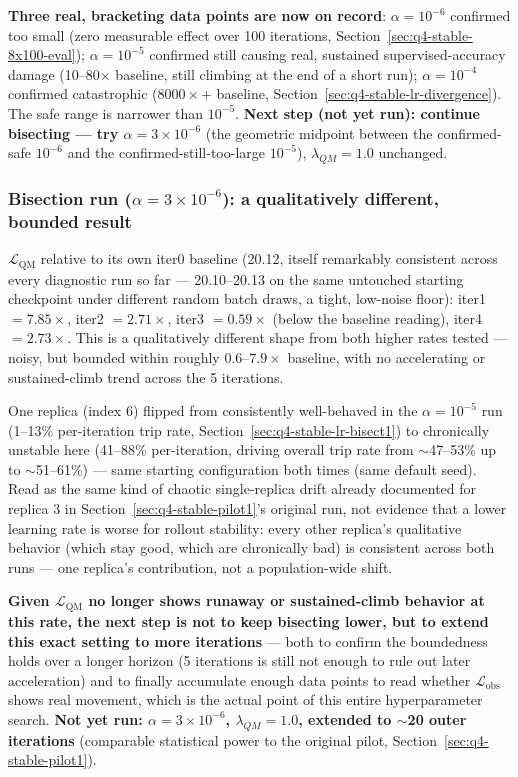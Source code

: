 \documentclass[11pt]{article}
\begin{document}
\textbf{Three real, bracketing data points are now on record}: $\alpha=
10^{-6}$ confirmed too small (zero measurable effect over 100 iterations,
Section~\ref{sec:q4-stable-8x100-eval}); $\alpha=10^{-5}$ confirmed still
causing real, sustained supervised-accuracy damage (10--80$\times$
baseline, still climbing at the end of a short run); $\alpha=10^{-4}$
confirmed catastrophic ($8000\times$+ baseline,
Section~\ref{sec:q4-stable-lr-divergence}). The safe range is narrower than
$10^{-5}$. \textbf{Next step (not yet run): continue bisecting --- try
$\alpha=3\times10^{-6}$} (the geometric midpoint between the confirmed-safe
$10^{-6}$ and the confirmed-still-too-large $10^{-5}$), $\lambda_{QM}=1.0$
unchanged.

\subsubsection{Bisection run ($\alpha=3\times10^{-6}$): a qualitatively different, bounded result}
\label{sec:q4-stable-lr-bisect2}

$\mathcal{L}_{\text{QM}}$ relative to its own iter0 baseline (20.12, itself
remarkably consistent across every diagnostic run so far --- 20.10--20.13
on the same untouched starting checkpoint under different random batch
draws, a tight, low-noise floor): iter1 $=7.85\times$, iter2 $=2.71\times$,
iter3 $=0.59\times$ (below the baseline reading), iter4 $=2.73\times$. This
is a qualitatively different shape from both higher rates tested --- noisy,
but bounded within roughly $0.6$--$7.9\times$ baseline, with no accelerating
or sustained-climb trend across the 5 iterations.

One replica (index 6) flipped from consistently well-behaved in the
$\alpha=10^{-5}$ run (1--13\% per-iteration trip rate,
Section~\ref{sec:q4-stable-lr-bisect1}) to chronically unstable here
(41--88\% per-iteration, driving overall trip rate from
$\sim$47--53\% up to $\sim$51--61\%) --- same starting configuration both
times (same default seed). Read as the same kind of chaotic single-replica
drift already documented for replica 3 in
Section~\ref{sec:q4-stable-pilot1}'s original run, not evidence that a
lower learning rate is worse for rollout stability: every other replica's
qualitative behavior (which stay good, which are chronically bad) is
consistent across both runs --- one replica's contribution, not a
population-wide shift.

\textbf{Given $\mathcal{L}_{\text{QM}}$ no longer shows runaway or
sustained-climb behavior at this rate, the next step is not to keep
bisecting lower, but to extend this exact setting to more iterations} ---
both to confirm the boundedness holds over a longer horizon (5 iterations
is still not enough to rule out later acceleration) and to finally
accumulate enough data points to read whether $\mathcal{L}_{\text{obs}}$
shows real movement, which is the actual point of this entire
hyperparameter search. \textbf{Not yet run: $\alpha=3\times10^{-6}$,
$\lambda_{QM}=1.0$, extended to $\sim$20 outer iterations} (comparable
statistical power to the original pilot, Section~\ref{sec:q4-stable-pilot1}).
\end{document}
